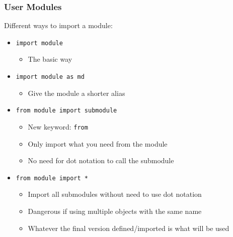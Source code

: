 \documentclass{beamer}
\newcommand{\code}[1]{\texttt{#1}}
\begin{document}
\begin{frame}	
	\frametitle{User Modules}
	
	\begin{block}{Different ways to import a module:}
		\begin{itemize}
			\item \code{import module}
			\begin{itemize}
				\item The basic way
			\end{itemize}
			\item \code{import module as md}
			\begin{itemize}
				\item Give the module a shorter alias
			\end{itemize}
			\item \code{from module import submodule}
			\begin{itemize}
				\item New keyword: \code{from}
				\item Only import what you need from the module
				\item No need for dot notation to call the submodule
			\end{itemize}
			\item \code{from module import *}
			\begin{itemize}
				\item Import all submodules without need to use dot notation
				\item Dangerous if using multiple objects with the same name
				\item Whatever the final version defined/imported is what will be used
			\end{itemize}
		\end{itemize}
	\end{block}
	
\end{frame}
\end{document}
